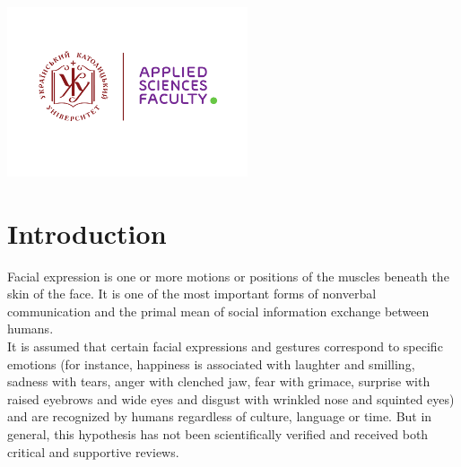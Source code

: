 \begin{titlepage}

\includegraphics[height=5cm]{UCU-Apps.png}\\[1cm] %
 

\vfill %

\end{titlepage}


	

\section{Introduction}

Facial expression is one or more motions or positions of the muscles beneath the skin of the face. It is one of the most important forms of nonverbal communication and the primal mean of social information exchange between humans.\\

It is assumed that certain facial expressions and gestures correspond to specific emotions (for instance, happiness is associated with laughter and smilling, sadness with tears, anger with clenched jaw, fear with grimace, surprise with raised eyebrows and wide eyes and disgust with wrinkled nose and squinted eyes) and are recognized by humans regardless of culture, language or time. But in general, this hypothesis has not been scientifically verified and received both critical and supportive reviews.\\

